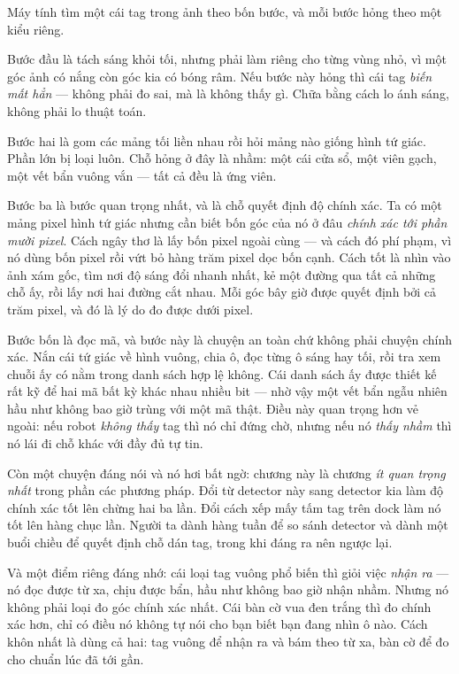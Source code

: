 \documentclass[../../marker.tex]{subfiles}
\begin{document}
\begin{dongian}
Máy tính tìm một cái tag trong ảnh theo bốn bước, và mỗi bước hỏng theo một kiểu riêng.

Bước đầu là tách sáng khỏi tối, nhưng phải làm riêng cho từng vùng nhỏ, vì một góc ảnh có nắng còn góc kia có bóng râm. Nếu bước này hỏng thì cái tag \emph{biến mất hẳn} --- không phải đo sai, mà là không thấy gì. Chữa bằng cách lo ánh sáng, không phải lo thuật toán.

Bước hai là gom các mảng tối liền nhau rồi hỏi mảng nào giống hình tứ giác. Phần lớn bị loại luôn. Chỗ hỏng ở đây là nhầm: một cái cửa sổ, một viên gạch, một vết bẩn vuông vắn --- tất cả đều là ứng viên.

Bước ba là bước quan trọng nhất, và là chỗ quyết định độ chính xác. Ta có một mảng pixel hình tứ giác nhưng cần biết bốn góc của nó ở đâu \emph{chính xác tới phần mười pixel}. Cách ngây thơ là lấy bốn pixel ngoài cùng --- và cách đó phí phạm, vì nó dùng bốn pixel rồi vứt bỏ hàng trăm pixel dọc bốn cạnh. Cách tốt là nhìn vào ảnh xám gốc, tìm nơi độ sáng đổi nhanh nhất, kẻ một đường qua tất cả những chỗ ấy, rồi lấy nơi hai đường cắt nhau. Mỗi góc bây giờ được quyết định bởi cả trăm pixel, và đó là lý do đo được dưới pixel.

Bước bốn là đọc mã, và bước này là chuyện an toàn chứ không phải chuyện chính xác. Nắn cái tứ giác về hình vuông, chia ô, đọc từng ô sáng hay tối, rồi tra xem chuỗi ấy có nằm trong danh sách hợp lệ không. Cái danh sách ấy được thiết kế rất kỹ để hai mã bất kỳ khác nhau nhiều bit --- nhờ vậy một vết bẩn ngẫu nhiên hầu như không bao giờ trùng với một mã thật. Điều này quan trọng hơn vẻ ngoài: nếu robot \emph{không thấy} tag thì nó chỉ đứng chờ, nhưng nếu nó \emph{thấy nhầm} thì nó lái đi chỗ khác với đầy đủ tự tin.

Còn một chuyện đáng nói và nó hơi bất ngờ: chương này là chương \emph{ít quan trọng nhất} trong phần các phương pháp. Đổi từ detector này sang detector kia làm độ chính xác tốt lên chừng hai ba lần. Đổi cách xếp mấy tấm tag trên dock làm nó tốt lên hàng chục lần. Người ta dành hàng tuần để so sánh detector và dành một buổi chiều để quyết định chỗ dán tag, trong khi đáng ra nên ngược lại.

Và một điểm riêng đáng nhớ: cái loại tag vuông phổ biến thì giỏi việc \emph{nhận ra} --- nó đọc được từ xa, chịu được bẩn, hầu như không bao giờ nhận nhầm. Nhưng nó không phải loại đo góc chính xác nhất. Cái bàn cờ vua đen trắng thì đo chính xác hơn, chỉ có điều nó không tự nói cho bạn biết bạn đang nhìn ô nào. Cách khôn nhất là dùng cả hai: tag vuông để nhận ra và bám theo từ xa, bàn cờ để đo cho chuẩn lúc đã tới gần.

\end{dongian}
\end{document}
